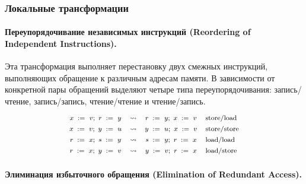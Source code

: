 \subsubsection{Локальные трансформации}

\paragraph{
Переупорядочивание независимых инструкций
(Reordering of Independent Instructions).
} 

Эта трансформация выполняет перестановку 
двух смежных инструкций, выполняющих обращение к 
различным адресам памяти. 
В зависимости от конкретной пары обращений выделяют 
четыре типа переупорядочивания:
запись/чтение, запись/запись,
чтение/чтение и чтение/запись. 
%
\[\def\arraystretch{1.4}\footnotesize
  \begin{array}{cccl} 

      \writeInst{}{x}{v} \seq \readInst{}{r}{y} 
    & \leadsto 
    & \readInst{}{r}{y} \seq \writeInst{}{x}{v}
    & \text{store/load}  \\ 

      \writeInst{}{x}{v} \seq \writeInst{}{y}{u} 
    & \leadsto 
    & \writeInst{}{y}{u} \seq \writeInst{}{x}{v}
    & \text{store/store}  \\ 

      \readInst{}{r}{x} \seq \readInst{}{s}{y} 
    & \leadsto 
    & \readInst{}{s}{y} \seq \readInst{}{r}{x}
    & \text{load/load}  \\ 

      \readInst{}{r}{x} \seq \writeInst{}{y}{v} 
    & \leadsto 
    & \writeInst{}{y}{v} \seq \readInst{}{r}{x}
    & \text{load/store}  \\ 

  \end{array}
\]

\paragraph{
Элиминация избыточного обращения
(Elimination of Redundant Access).
} 

